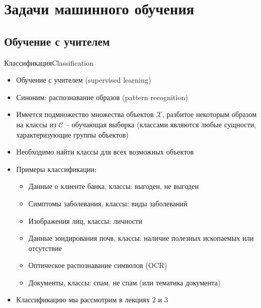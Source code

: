 \documentclass[compress,red,unicode]{beamer}
\begin{document}
\section{Задачи машинного обучения}

\subsection{Обучение с учителем}

\begin{frame}{Классификация}{Classification}
	\begin{itemize}
		\item Обучение с учителем (supervised learning)
		\item Синоним: распознавание образов (pattern recognition)
		\item Имеется подмножество множества объектов $\mathcal{X}$, разбитое некоторым образом на классы из $\mathcal{C}$ -- обучающая выборка (классами являются любые сущности, характеризующие группы объектов)
		\item Необходимо найти классы для всех возможных объектов
		\item Примеры классификации:
		\begin{itemize}
			\item Данные о клиенте банка, классы: {\color{main!90!black} выгоден, не выгоден}
			\item Симптомы заболевания, классы: {\color{main!90!black} виды заболеваний}
			\item Изображения лиц, классы: {\color{main!90!black} личности}
			\item Данные зондирования почв, классы: {\color{main!90!black} наличие полезных ископаемых или отсутствие}
			\item Оптическое распознавание символов (OCR)
			\item Документы, классы: {\color{main!90!black} спам, не спам (или тематика документа)}
		\end{itemize}
		\item Классификацию мы рассмотрим в лекциях 2 и 3
	\end{itemize}
\end{frame}
\end{document}
